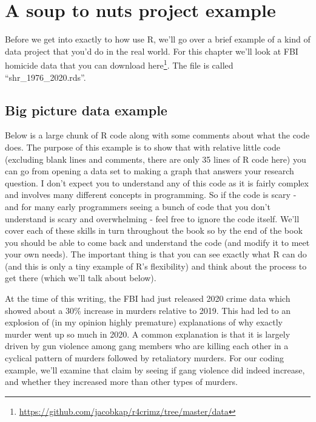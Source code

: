 \documentclass[
]{krantz}
\renewcommand{\href}[2]{#2\footnote{\url{#1}}}
\begin{document}
\hypertarget{a-soup-to-nuts-project-example}{%
\chapter{A soup to nuts project example}\label{a-soup-to-nuts-project-example}}

Before we get into exactly to how use R, we'll go over a brief example of a kind of data project that you'd do in the real world. For this chapter we'll look at FBI homicide data that you can download \href{https://github.com/jacobkap/r4crimz/tree/master/data}{here}. The file is called ``shr\_1976\_2020.rds''.

\hypertarget{big-picture-data-example}{%
\section{Big picture data example}\label{big-picture-data-example}}

Below is a large chunk of R code along with some comments about what the code does. The purpose of this example is to show that with relative little code (excluding blank lines and comments, there are only 35 lines of R code here) you can go from opening a data set to making a graph that answers your research question. I don't expect you to understand any of this code as it is fairly complex and involves many different concepts in programming. So if the code is scary - and for many early programmers seeing a bunch of code that you don't understand is scary and overwhelming - feel free to ignore the code itself. We'll cover each of these skills in turn throughout the book so by the end of the book you should be able to come back and understand the code (and modify it to meet your own needs). The important thing is that you can see exactly what R can do (and this is only a tiny example of R's flexibility) and think about the process to get there (which we'll talk about below).

At the time of this writing, the FBI had just released 2020 crime data which showed about a 30\% increase in murders relative to 2019. This had led to an explosion of (in my opinion highly premature) explanations of why exactly murder went up so much in 2020. A common explanation is that it is largely driven by gun violence among gang members who are killing each other in a cyclical pattern of murders followed by retaliatory murders. For our coding example, we'll examine that claim by seeing if gang violence did indeed increase, and whether they increased more than other types of murders.
\end{document}
